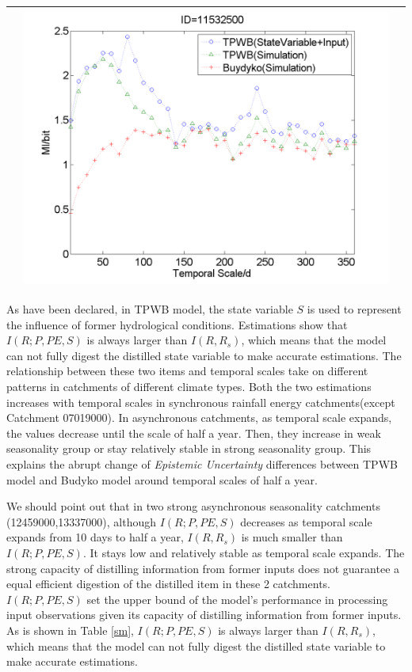 \documentclass[draft,wrr]{AGUTeX}
\begin{document}
\begin{article}
\begin{table}[H]
{\begin{tabular}{ccc}
&\begin{minipage}{.6\textwidth}\includegraphics[width=\linewidth]{resultgraph/11532500MI.png}\end{minipage}
\\
\hline
\end{tabular}
}
\end{table}

As have been declared, in TPWB model,  the state variable $S$ is used to  represent the influence of former hydrological conditions. Estimations show that $I(R;P,PE,S)$ is always larger than $I(R,R_s)$, which means that 
the model can not fully  digest the distilled state variable to make accurate estimations. The relationship between these two items and temporal scales take on different patterns in catchments of different climate types. Both the two estimations increases with temporal scales in synchronous rainfall energy catchments(except Catchment 07019000). In asynchronous catchments, as temporal scale expands, the values decrease until the scale of half a year. Then, they increase in weak seasonality group or stay relatively stable in strong seasonality group. This explains the abrupt change of \emph{Epistemic Uncertainty} differences between TPWB model and Budyko model around temporal scales of half a year. 

We should point out that in two strong asynchronous seasonality catchments (12459000,13337000), although $I(R;P,PE,S)$ decreases as temporal scale expands from 10 days to half a year, $I(R,R_s)$ is much smaller than $I(R;P,PE,S)$. It stays low and relatively stable as temporal scale expands. The strong  capacity of distilling information from former inputs does not guarantee a equal efficient digestion of the distilled item in these 2 catchments. 
\iffalse
$I(R;P,PE,S)$ set the upper bound of the model's performance in processing input observations given its capacity of distilling information from former inputs. As is shown in Table \ref{sm}, $I(R;P,PE,S)$ is always larger than $I(R,R_s)$, which means that the model can not fully  digest the distilled state variable to make accurate estimations. 



\end{article}
\end{document}
